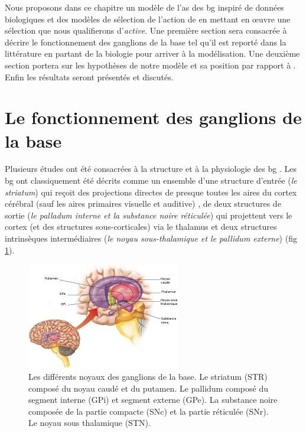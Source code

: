 Nous proposons dans ce chapitre un modèle de l'\gls{as} des \gls{bg} inspiré de données biologiques et des modèles de sélection de l'action de \cite{Gurney:2001a,Girard:2008} en mettant en œuvre une sélection que nous qualifierons d'\textit{active}. Une première section sera consacrée à décrire le fonctionnement des ganglions de la base tel qu'il est reporté dans la littérature en partant de la biologie pour arriver à la modélisation. Une deuxième section portera sur les hypothèses de notre modèle et sa position par rapport à \cite{Gurney:2001a,Gurney:2001b,Girard:2005a,Girard:2008}. Enfin les résultats seront présentés et discutés.\\

\section{Le fonctionnement des ganglions de la base}

Plusieurs études ont été consacrées à la structure et à la physiologie des \gls{bg} \cite{Houk:1994, Graybiel:1998, DeLong:2000}. Les \gls{bg} ont classiquement été décrits comme un ensemble d'une structure d'entrée (\textit{le striatum}) qui reçoit des projections directes de presque toutes les aires du cortex cérébral (sauf les aires primaires visuelle et auditive) \cite{Cherubini:1988,Kemp:1970,kitai:1976,McGeer:1977}, de deux structures de sortie (\textit{le palladum interne et la substance noire réticulée}) qui projettent vers le cortex (et des structures sous-corticales) via le thalamus et deux structures intrinsèques intermédiaires (\textit{le noyau sous-thalamique et le pallidum externe}) (fig \ref{fig:BG1}).\\

\begin{figure}
  \begin{center}
    \includegraphics[width=0.6\textwidth]{figures/ch4_1_BG1}
  \end{center}
  \caption {Les différents noyaux des ganglions de la base. Le striatum (STR) composé du noyau caudé et du putamen. Le pallidum composé du segment interne (GPi) et segment externe (GPe). La substance noire composée de la partie compacte (SNc) et la partie réticulée (SNr). Le noyau sous thalamique (STN).} %
  \label{fig:BG1}
\end{figure}


